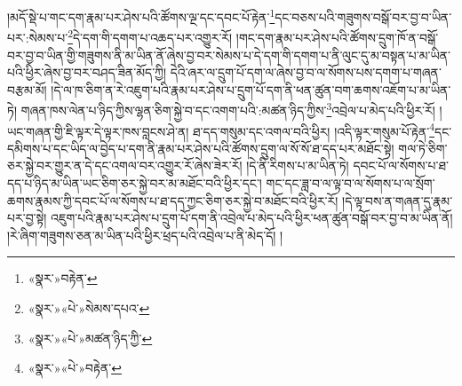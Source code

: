 །མདོ་སྡེ་པ་གང་དག་རྣམ་པར་ཤེས་པའི་ཚོགས་ལྔ་དང་དབང་པོ་རྟེན་\footnote{«སྣར་»བརྟེན་}དང་བཅས་པའི་གཟུགས་བསྒོ་བར་བྱ་བ་ཡིན་པར་:སེམས་པ་\footnote{«སྣར་»«པེ་»སེམས་དཔའ་}དེ་དག་གི་དགག་པ་འཆད་པར་འགྱུར་རོ། །གང་དག་རྣམ་པར་ཤེས་པའི་ཚོགས་དྲུག་ཁོ་ན་བསྒོ་བར་བྱ་བ་ཡིན་གྱི་གཟུགས་ནི་མ་ཡིན་ནོ་ཞེས་བྱ་བར་སེམས་པ་དེ་དག་གི་དགག་པ་ནི་ལུང་དུ་མ་བསྟན་པ་མ་ཡིན་པའི་ཕྱིར་ཞེས་བྱ་བར་བཤད་ཟིན་མོད་ཀྱི། དེའི་ཞར་ལ་དྲུག་པོ་དག་ལ་ཞེས་བྱ་བ་ལ་སོགས་པས་དགག་པ་གཞན་བརྩམ་མོ། །དེ་ལ་ཁ་ཅིག་ན་རེ་འཇུག་པའི་རྣམ་པར་ཤེས་པ་དྲུག་པོ་དག་ནི་ཕན་ཚུན་བག་ཆགས་འཇོག་པ་མ་ཡིན་ཏེ། གཞན་ཁས་ལེན་པ་ཉིད་ཀྱིས་ལྷན་ཅིག་སྐྱེ་བ་དང་འགག་པའི་:མཚན་ཉིད་ཀྱིས་\footnote{«སྣར་»«པེ་»མཚན་ཉིད་ཀྱི་}འབྲེལ་པ་མེད་པའི་ཕྱིར་རོ། །ཡང་གཞན་གྱི་ཇི་ལྟར་དེ་ལྟར་ཁས་བླངས་ཤེ་ན། ཐ་དད་གསུམ་དང་འགལ་བའི་ཕྱིར། །འདི་ལྟར་གསུམ་པོ་རྟེན་\footnote{«སྣར་»«པེ་»བརྟེན་}དང་དམིགས་པ་དང་ཡིད་ལ་བྱེད་པ་དག་ནི་རྣམ་པར་ཤེས་པའི་ཚོགས་དྲུག་ལ་སོ་སོ་ཐ་དད་པར་མཐོང་སྟེ། གལ་ཏེ་ཅིག་ཅར་སྐྱེ་བར་གྱུར་ན་དེ་དང་འགལ་བར་འགྱུར་རོ་ཞེས་ཟེར་རོ། །དེ་ནི་རིགས་པ་མ་ཡིན་ཏེ། དབང་པོ་ལ་སོགས་པ་ཐ་དད་པ་ཉིད་མ་ཡིན་ཡང་ཅིག་ཅར་སྐྱེ་བར་མ་མཐོང་བའི་ཕྱིར་དང་། གང་དང་ཟླ་བ་ལ་ལྟ་བ་ལ་སོགས་པ་ལ་སྲོག་ཆགས་རྣམས་ཀྱི་དབང་པོ་ལ་སོགས་པ་ཐ་དད་ཀྱང་ཅིག་ཅར་སྐྱེ་བ་མཐོང་བའི་ཕྱིར་རོ། །དེ་ལྟ་བས་ན་གཞན་དུ་རྣམ་པར་བྱ་སྟེ། འཇུག་པའི་རྣམ་པར་ཤེས་པ་དྲུག་པོ་དག་ནི་འབྲེལ་པ་མེད་པའི་ཕྱིར་ཕན་ཚུན་བསྒོ་བར་བྱ་བ་མ་ཡིན་ནོ། །རེ་ཞིག་གཟུགས་ཅན་མ་ཡིན་པའི་ཕྱིར་ཕྲད་པའི་འབྲེལ་པ་ནི་མེད་དོ། །
